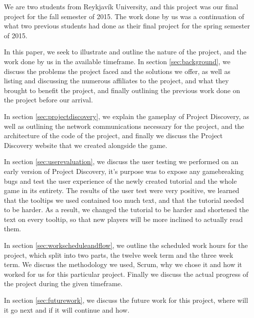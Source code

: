 We are two students from Reykjavík University, and this project was our final project for the fall semester of 2015. The work done by us was a continuation of what two previous students had done as their final project for the spring semester of 2015. 

In this paper, we seek to illustrate and outline the nature of the project, and the work done by us in the available timeframe. In section \ref{sec:background}, we discuss the problems the project faced and the solutions we offer, as well as listing and discussing the numerous affiliates to the project, and what they brought to benefit the project, and finally outlining the previous work done on the project before our arrival. 

In section \ref{sec:projectdiscovery}, we explain the gameplay of Project Discovery, as well as outlining the network communications necessary for the project, and the architecture of the code of the project, and finally we discuss the Project Discovery website that we created alongside the game. 

In section \ref{sec:userevaluation}, we discuss the user testing we performed on an early version of Project Discovery, it's purpose was to expose any gamebreaking bugs and test the user experience of the newly created tutorial and the whole game in its entirety. The results of the user test were very positive, we learned that the tooltips we used contained too much text, and that the tutorial needed to be harder. As a result, we changed the tutorial to be harder and shortened the text on every tooltip, so that new players will be more inclined to actually read them.

In section \ref{sec:workscheduleandflow}, we outline the scheduled work hours for the project, which split into two parts, the twelve week term and the three week term. We discuss the methodology we used, Scrum, why we chose it and how it worked for us for this particular project. Finally we discuss the actual progress of the project during the given timeframe.

In section \ref{sec:futurework}, we discuss the future work for this project, where will it go next and if it will continue and how.